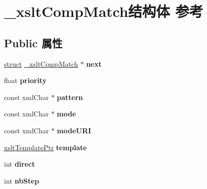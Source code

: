 \hypertarget{struct__xslt_comp_match}{}\section{\+\_\+xslt\+Comp\+Match结构体 参考}
\label{struct__xslt_comp_match}
\subsection*{Public 属性}
\begin{DoxyCompactItemize}
\item 
\mbox{\label{struct__xslt_comp_match_a66d0fa2c49323c8eeaf41916886a3c8f}} 
\hyperlink{interfacestruct}{struct} \hyperlink{struct__xslt_comp_match}{\+\_\+xslt\+Comp\+Match} $\ast$ {\bfseries next}
\item 
\mbox{\label{struct__xslt_comp_match_adcd67b774f05b59b99a5b4808ade009b}} 
float {\bfseries priority}
\item 
\mbox{\label{struct__xslt_comp_match_a05bd513c64d3adaa27f3f1df72c4d6ae}} 
const xml\+Char $\ast$ {\bfseries pattern}
\item 
\mbox{\label{struct__xslt_comp_match_ab53b9a4af76fb67612c6f05a7ea8be1d}} 
const xml\+Char $\ast$ {\bfseries mode}
\item 
\mbox{\label{struct__xslt_comp_match_af5c6f8c678b8682874dfdfefe9c8eb93}} 
const xml\+Char $\ast$ {\bfseries mode\+U\+RI}
\item 
\mbox{\label{struct__xslt_comp_match_a6bdf9401ea2921815dfeb1c5659ac52a}} 
\hyperlink{struct__xslt_template}{xslt\+Template\+Ptr} {\bfseries template}
\item 
\mbox{\label{struct__xslt_comp_match_aed1be7094795ffd9c64703448939c661}} 
int {\bfseries direct}
\item 
\mbox{\label{struct__xslt_comp_match_ae4d423b99e9b60c27445572fd059abec}} 
int {\bfseries nb\+Step}
\item 
\mbox{\label{struct__xslt_comp_match_a80e8254b14040a29bdae5091011f86f9}} 

\end{DoxyCompactItemize}
